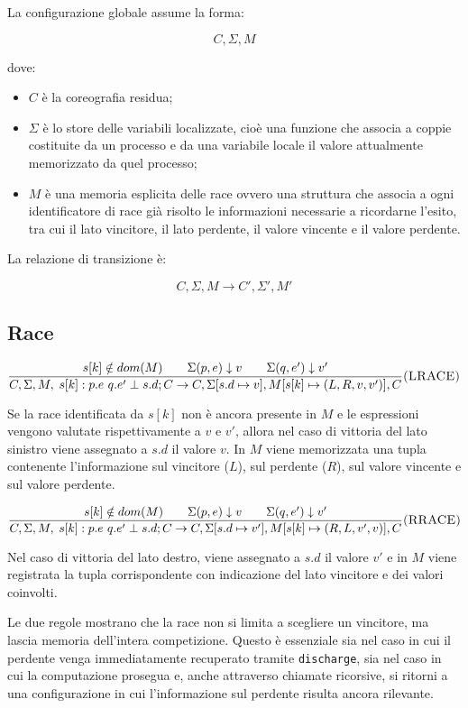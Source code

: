 La configurazione globale assume la forma:

\[
C, \Sigma, M
\]

dove:

\begin{itemize}
\item \(C\) è la coreografia residua;
\item \(\Sigma\) è lo store delle variabili localizzate, cioè una funzione che associa a coppie costituite da un processo e da una variabile locale il valore attualmente memorizzato da quel processo;
\item \(M\) è una memoria esplicita delle race ovvero una struttura che associa a ogni identificatore di race già risolto le informazioni necessarie a ricordarne l’esito, tra cui il lato vincitore, il lato perdente, il valore vincente e il valore perdente.
\end{itemize}

La relazione di transizione è:

\[
C, \Sigma, M \rightarrow C', \Sigma', M'
\]

\subsection*{Race}

\[
\frac{
s[k] \notin dom(M)
\qquad
\Sigma(p,e) \downarrow v
\qquad
\Sigma(q,e') \downarrow v'
}{
C,\Sigma,M,\; s[k] : p.e\ q.e' \perp s.d ; C
\rightarrow
C,\Sigma[s.d \mapsto v],M[s[k] \mapsto (L,R,v,v')],C
}
\rulelabel{LRACE}
\]

Se la race identificata da \(s[k]\) non è ancora presente in \(M\) e le espressioni vengono valutate rispettivamente a \(v\) e \(v'\), allora nel caso di vittoria del lato sinistro viene assegnato a \(s.d\) il valore \(v\). In \(M\) viene memorizzata una tupla contenente l’informazione sul vincitore (\(L\)), sul perdente (\(R\)), sul valore vincente e sul valore perdente.

\[
\frac{
s[k] \notin dom(M)
\qquad
\Sigma(p,e) \downarrow v
\qquad
\Sigma(q,e') \downarrow v'
}{
C,\Sigma,M,\; s[k] : p.e\ q.e' \perp s.d ; C
\rightarrow
C,\Sigma[s.d \mapsto v'],M[s[k] \mapsto (R,L,v',v)],C
}
\rulelabel{RRACE}
\]

Nel caso di vittoria del lato destro, viene assegnato a \(s.d\) il valore \(v'\) e in \(M\) viene registrata la tupla corrispondente con indicazione del lato vincitore e dei valori coinvolti.

Le due regole mostrano che la race non si limita a scegliere un vincitore, ma lascia memoria dell’intera competizione. Questo è essenziale sia nel caso in cui il perdente venga immediatamente recuperato tramite \texttt{discharge}, sia nel caso in cui la computazione prosegua e, anche attraverso chiamate ricorsive, si ritorni a una configurazione in cui l’informazione sul perdente risulta ancora rilevante.

